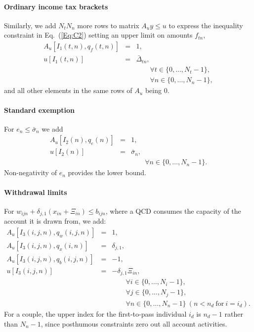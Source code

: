 \documentclass[fleqn,12pt]{report}
\begin{document}
\paragraph*{Ordinary income tax brackets}
Similarly, we add $N_t N_n$ more rows to matrix $A_uy \le u$ to express
the inequality constraint in Eq.~(\ref{Eq:C2})
setting an upper limit on amounts $f_{tn}$,
\begin{eqnarray}
	A_u[I_1(t, n), q_{f}(t, n)] &=& 1, \nonumber \\
	u[I_1(t, n)] &=& \bar{\Delta}_{tn},\\
	&&\qquad\forall t \in \{0,\ldots, N_t - 1\}, \nonumber\\
	&&\qquad\forall n \in \{0,\ldots, N_n - 1\},\nonumber
\end{eqnarray}
and all other elements in the same rows of $A_u$ being $0$.

\paragraph*{Standard exemption}
For $e_n \le \bar{\sigma}_n$ we add
\begin{eqnarray}
	A_u[I_2(n), q_e(n)] &=& 1, \nonumber \\
	u[I_2(n)] &=& \bar{\sigma}_{n},\\
	&&\qquad\forall n \in \{0,\ldots, N_n - 1\}. \nonumber
\end{eqnarray}
Non-negativity of $e_n$ provides the lower bound.

\paragraph*{Withdrawal limits}
For $w_{ijn} + \delta_{j,1} (x_{in} + \Xi_{in}) \le b_{ijn}$, where a QCD consumes the
capacity of the account it is drawn from, we add:
\begin{eqnarray}
	A_u[I_3(i, j, n), q_{w}(i, j, n)] &=& 1, \nonumber \\
	A_u[I_3(i, j, n), q_{x}(i, n)] &=& \delta_{j, 1}, \nonumber \\
	A_u[I_3(i, j, n), q_{b}(i, j, n)] &=& -1, \nonumber \\
	u[I_3(i, j, n)] &=& -\delta_{j, 1}\Xi_{in}, \nonumber \\
	&&\qquad\forall i \in \{0,\ldots, N_i - 1\},\nonumber\\
	&&\qquad\forall j \in \{0,\ldots, N_j - 1\},\nonumber\\
	&&\qquad\forall n \in \{0,\ldots, N_n - 1\}~(n < n_d~\text{for}~i = i_d). \nonumber
\end{eqnarray}
For a couple, the upper index for the first-to-pass individual $i_d$ is $n_d - 1$
rather than $N_n - 1$, since posthumous constraints zero out all account activities.
\end{document}
